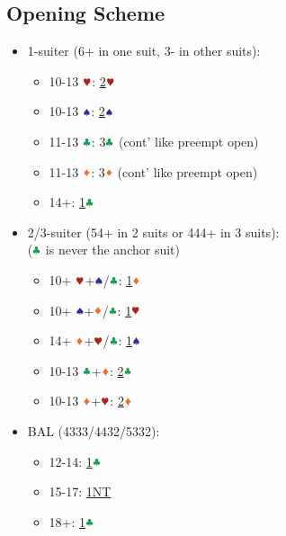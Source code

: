 \documentclass{article}
\begin{document}
\begin{multicols}{2}
\begin{CJK*}{UTF8}{gt}
\section{Opening Scheme}
\begin{itemize}
    \item 1-suiter (6+ in one suit, 3- in other suits):
    \begin{itemize}
        \item 10-13 $\hhh$: \hyperref[sec:1suit]{2$\hhh$}
        \item 10-13 $\sss$: \hyperref[sec:1suit]{2$\sss$}
        \item 11-13 $\ccc$: 3$\ccc$ (cont' like preempt open)
        \item 11-13 $\ddd$: 3$\ddd$ (cont' like preempt open)
        \item 14+: \hyperref[sec:1c]{1$\ccc$}
    \end{itemize}
    \item 2/3-suiter (54+ in 2 suits or 444+ in 3 suits):\\
    ($\ccc$ is never the anchor suit)
    \begin{itemize}
        \item 10+ $\hhh$+$\sss$/$\ccc$: \hyperref[sec:1d]{1$\ddd$}
        \item 10+ $\sss$+$\ddd$/$\ccc$: \hyperref[sec:1h]{1$\hhh$}
        \item 14+ $\ddd$+$\hhh$/$\ccc$: \hyperref[sec:1s]{1$\sss$}
        \item 10-13 $\ccc$+$\ddd$: \hyperref[sec:2cd]{2$\ccc$}
        \item 10-13 $\ddd$+$\hhh$: \hyperref[sec:2cd]{2$\ddd$}
    \end{itemize}
    \item BAL (4333/4432/5332):
    \begin{itemize}
        \item 12-14: \hyperref[sec:1c]{1$\ccc$}
        \item 15-17: \hyperref[sec:1n]{1NT}
        \item 18+: \hyperref[sec:1c]{1$\ccc$}
    \end{itemize}
\end{itemize}


\end{CJK*}
\end{multicols}
\end{document}
